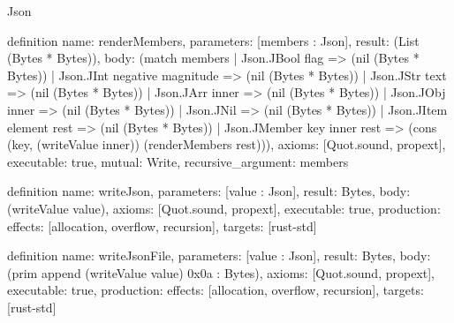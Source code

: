 \begin{lexlean}{Json}
\begin{semanticmodule}
definition{
  name: renderMembers,
  parameters: [members : Json],
  result: (List (Bytes * Bytes)),
  body: (match members
    | Json.JBool flag => (nil (Bytes * Bytes))
    | Json.JInt negative magnitude => (nil (Bytes * Bytes))
    | Json.JStr text => (nil (Bytes * Bytes))
    | Json.JArr inner => (nil (Bytes * Bytes))
    | Json.JObj inner => (nil (Bytes * Bytes))
    | Json.JNil => (nil (Bytes * Bytes))
    | Json.JItem element rest => (nil (Bytes * Bytes))
    | Json.JMember key inner rest => (cons (key, (writeValue inner)) (renderMembers rest))),
  axioms: [Quot.sound, propext],
  executable: true,
  mutual: Write,
  recursive_argument: members
}

definition{
  name: writeJson,
  parameters: [value : Json],
  result: Bytes,
  body: (writeValue value),
  axioms: [Quot.sound, propext],
  executable: true,
  production: {effects: [allocation, overflow, recursion], targets: [rust-std]}
}

definition{
  name: writeJsonFile,
  parameters: [value : Json],
  result: Bytes,
  body: (prim append (writeValue value) 0x0a : Bytes),
  axioms: [Quot.sound, propext],
  executable: true,
  production: {effects: [allocation, overflow, recursion], targets: [rust-std]}
}
\end{semanticmodule}
\end{lexlean}
